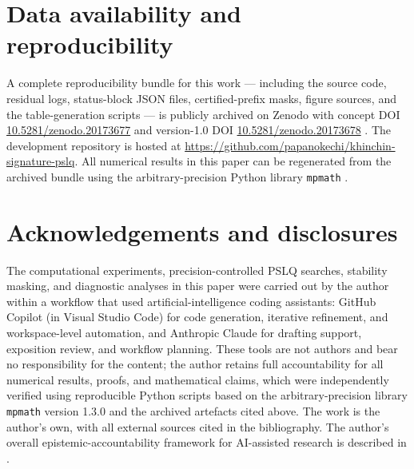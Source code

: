 \documentclass[11pt]{amsart}
\begin{document}
\section*{Data availability and reproducibility}

A complete reproducibility bundle for this work --- including the source code, residual logs, status-block JSON files, certified-prefix masks, figure sources, and the table-generation scripts --- is publicly archived on Zenodo with concept DOI \href{https://doi.org/10.5281/zenodo.20173677}{10.5281/zenodo.20173677} and version-1.0 DOI \href{https://doi.org/10.5281/zenodo.20173678}{10.5281/zenodo.20173678} \cite{KhinchinSignatureBundle2026}. The development repository is hosted at \url{https://github.com/papanokechi/khinchin-signature-pslq}. All numerical results in this paper can be regenerated from the archived bundle using the arbitrary-precision Python library \texttt{mpmath} \cite{mpmath2023}.

\section*{Acknowledgements and disclosures}

The computational experiments, precision-controlled PSLQ searches, stability masking, and diagnostic analyses in this paper were carried out by the author within a workflow that used artificial-intelligence coding assistants: GitHub Copilot (in Visual Studio Code) for code generation, iterative refinement, and workspace-level automation, and Anthropic Claude for drafting support, exposition review, and workflow planning. These tools are not authors and bear no responsibility for the content; the author retains full accountability for all numerical results, proofs, and mathematical claims, which were independently verified using reproducible Python scripts based on the arbitrary-precision library \texttt{mpmath} version 1.3.0 \cite{mpmath2023} and the archived artefacts cited above. The work is the author's own, with all external sources cited in the bibliography. The author's overall epistemic-accountability framework for AI-assisted research is described in \cite{AEAL2025}.
\end{document}
